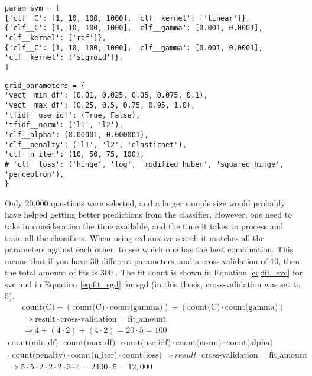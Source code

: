 \begin{lstlisting}[caption={Parameters for SVC}, label={lst:param_svc}] 
param_svm = [
{'clf__C': [1, 10, 100, 1000], 'clf__kernel': ['linear']},
{'clf__C': [1, 10, 100, 1000], 'clf__gamma': [0.001, 0.0001], 'clf__kernel': ['rbf']},
{'clf__C': [1, 10, 100, 1000], 'clf__gamma': [0.001, 0.0001], 'clf__kernel': ['sigmoid']},
]
\end{lstlisting}
\begin{lstlisting}[caption={Parameters for SGD}, label={lst:param_sgd}] 
grid_parameters = {
'vect__min_df': (0.01, 0.025, 0.05, 0.075, 0.1),
'vect__max_df': (0.25, 0.5, 0.75, 0.95, 1.0),
'tfidf__use_idf': (True, False),
'tfidf__norm': ('l1', 'l2'),
'clf__alpha': (0.00001, 0.000001),
'clf__penalty': ('l1', 'l2', 'elasticnet'),
'clf__n_iter': (10, 50, 75, 100),
# 'clf__loss': ('hinge', 'log', 'modified_huber', 'squared_hinge', 'perceptron'),
}
\end{lstlisting}
Only 20,000 questions were selected, and a larger sample size would probably have helped getting better predictions from the classifier.
However, one need to take in consideration the time available, and the time it takes to process and train all the classifiers. 
When using exhaustive search it matches all the parameters against each other, to see which one has the best combination. 
This means that if you have 30 different parameters, and a cross-validation of 10, then the total amount of fits is 300 \cite{Markham2015a, Bishop2006}.
The fit count is shown in Equation \ref{eq:fit_svc} for \gls{svc} and in Equation \ref{eq:fit_sgd} for \gls{sgd} (in this thesis, cross-validation was set to 5).
\begin{equation}\label{eq:fit_svc}
\begin{split}
\text{count(C)} + (\text{count(C)} \cdot \text{count(gamma)}) + (\text{count(C)} \cdot \text{count(gamma)}) \\
\Longrightarrow  \text{result} \cdot \text{cross-validation} = \text{fit\_amount} \\
\Longrightarrow  4 + (4 \cdot 2) + (4 \cdot 2) = 20 \cdot 5 = 100 
\end{split}
\end{equation}
\begin{equation}\label{eq:fit_sgd}
\begin{split}
\text{count(min\_df)} \cdot \text{count(max\_df)} \cdot \text{count(use\_idf)} \cdot \text{count(norm)} \cdot \text{count(alpha)} \\ 
\cdot ~ \text{count(penalty)} \cdot \text{count(n\_iter)} \cdot \text{count(loss)} \Longrightarrow  result \cdot \text{cross-validation} = \text{fit\_amount} \\
\Longrightarrow  5 \cdot 5 \cdot 2 \cdot 2 \cdot 2 \cdot 3 \cdot 4 = 2400 \cdot 5 = 12,000
\end{split}
\end{equation}
